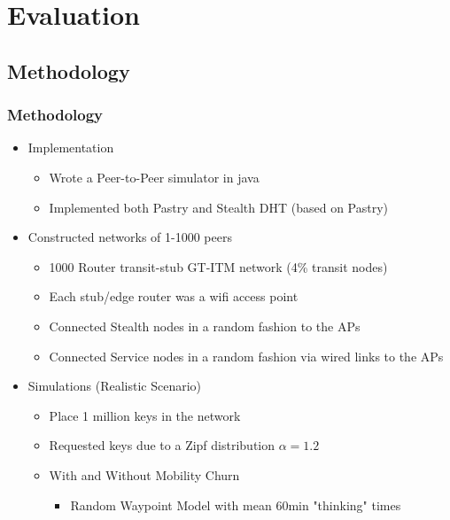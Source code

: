 \documentclass{beamer}
\begin{document}
\section{Evaluation}

\subsection[Methodology]{Methodology}

\begin{frame}
  \frametitle{Methodology}
  \begin{itemize}
  \item
    Implementation
    \begin{itemize}
      \item Wrote a Peer-to-Peer simulator in java
      \item Implemented both Pastry and Stealth DHT (based on
      Pastry)
    \end{itemize}
  \item
    Constructed networks of 1-1000 peers
    \begin{itemize}
      \item 1000 Router transit-stub GT-ITM network (4\% transit nodes)
      \item Each stub/edge router was a wifi access point
      \item Connected Stealth nodes in a random fashion to the APs
      \item Connected Service nodes in a random fashion via wired
      links to the APs
    \end{itemize}
  \item
    Simulations (Realistic Scenario)
    \begin{itemize}
      \item Place 1 million keys in the network
      \item Requested keys due to a Zipf distribution $\alpha = 1.2$
      \item With and Without Mobility Churn
        \begin{itemize}
            \item Random Waypoint Model with mean 60min "thinking" times
        \end{itemize}
    \end{itemize}
  \end{itemize}
\end{frame}
\end{document}
